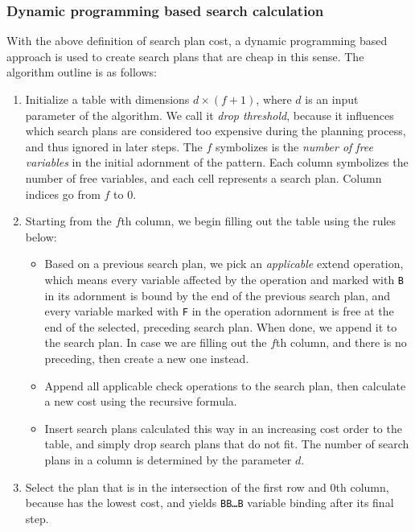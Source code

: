 \subsubsection{Dynamic programming based search calculation}

With the above definition of search plan cost, a dynamic programming based approach is used to create search plans that are cheap in this sense. The algorithm outline is as follows:

\begin{enumerate}
	\item Initialize a table with dimensions $d \times (f+1)$, where $d$ is an input parameter of the algorithm. We call it \emph{drop threshold}, because it influences which search plans are considered too expensive during the planning process, and thus ignored in later steps. The $f$ symbolizes is the \emph{number of free variables} in the initial adornment of the pattern. Each column symbolizes the number of free variables, and each cell represents a search plan. Column indices go from $f$ to $0$.
	\item Starting from the $f$th column, we begin filling out the table using the rules below:
		\begin{itemize}
			\item Based on a previous search plan, we pick an \emph{applicable} extend operation, which means every variable affected by the operation and marked with \texttt{B} in its adornment is bound by the end of the previous search plan, and every variable marked with \texttt{F} in the operation adornment is free at the end of the selected, preceding search plan. When done, we append it to the search plan. In case we are filling out the $f$th column, and there is no preceding, then create a new one instead.
			\item Append all applicable check operations to the search plan, then calculate a new cost using the recursive formula.
			\item Insert search plans calculated this way in an increasing cost order to the table, and simply drop search plans that do not fit. The number of search plans in a column is determined by the parameter $d$.
		\end{itemize}
	\item Select the plan that is in the intersection of the first row and $0$th column, because has the lowest cost, and yields \texttt{BB\ldots B} variable binding after its final step.
\end{enumerate}



